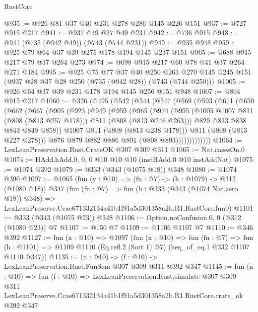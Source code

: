 \begin{lexlean}{RustCore}
\begin{coremodule}
@935 := @926 @81 @37 @40 @231 @278 @286 @145 @226 @151
@937 := @727 @915 @217
@941 := @937 @49 @37 @49 @231
@942 := @736 @915
@948 := @941 (@735 (@942 @49)) (@743 (@744 @231))
@949 := @935 @948
@959 := @925 @79 @64 @37 @39 @275 @178 @194 @145 @237 @151
@965 := @688 @915 @217 @79 @37 @264 @273
@974 := @698 @915 @217 @60 @78 @41 @37 @264 @271 @184
@995 := @925
    @75
    @77
    @37
    @40
    @250
    @263
    @270
    @145
    @245
    @151
    (@937 @28 @37 @28 @250 (@735 (@942 @28)) (@743 (@744 @250)))
@1005 := @926 @64 @37 @39 @231 @178 @194 @145 @256 @151 @948
@1007 := @804 @915 @217
@1060 := @326
    (@495
      (@542
        (@544
          (@547
            (@569
              (@593
                (@611
                  (@650
                    (@662
                      (@667
                        (@905
                          (@923
                            (@949
                              (@959
                                (@965
                                  (@974
                                    (@995
                                      (@1005 @1007 @811 (@808 (@813 @257 @178)))
                                      @811
                                      (@808 (@813 @246 @263)))
                                    @829
                                    @833
                                    @838
                                    @843
                                    @849
                                    @858))
                                @1007
                                @811
                                (@808 (@813 @238 @178)))
                              @811
                              (@808 (@813 @227 @278)))
                            @876
                            @879
                            @882
                            @886
                            @891
                            (@808 @893)))))))))))))
@1064 := LexLeanPreservation.Rust.CrateOK @307 @309 @311
@1065 := Nat.casesOn.{0}
@1074 := HAdd.hAdd.{0, 0, 0} @10 @10 @10 (instHAdd.{0} @10 instAddNat)
@1075 := @1074 @392
@1079 := @333 (@343 (@1075 @18)) @348
@1080 := @1074 @390
@1097 := @1065
    (fun (y : @10) => (fn : @7) -> (h : @1079) -> @312 (@1080 @18))
    @347
    (fun (fn : @7) =>
    fun (h : @333 (@343 (@1074 Nat.zero @18)) @348) =>
    LexLeanPreserve.Ccae671332134a41b1f91a5d301358a2b.R1.RustCore.fun0)
@1101 := @333 (@343 (@1075 @23)) @348
@1106 := Option.noConfusion.{0, 0} (@312 (@1080 @23)) @7
@1107 := @150 @7
@1109 := @1106 @1107 @7
@1110 := @346 @392
@1127 := fun (x : @10) =>
  @1097
    (fun (x : @10) =>
    fun (fn : @7) =>
    fun (h : @1101) => @1109 @1110 (Eq.refl.{2} (Sort 1) @7) (heq_of_eq.{1} @332 @1107 @1110 @347))
@1135 := (n : @10) -> (f : @10) -> LexLeanPreservation.Rust.FunSem @307 @309 @311 @392 @347
@1145 := fun (n : @10) =>
  fun (f : @10) =>
  LexLeanPreservation.Rust.simulate
    @307
    @309
    @311
    LexLeanPreserve.Ccae671332134a41b1f91a5d301358a2b.R1.RustCore.crate_ok
    @392
    @347
\end{coremodule}
\end{lexlean}
